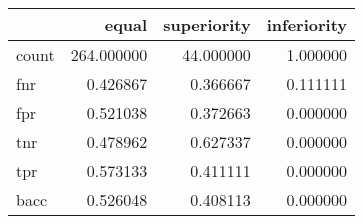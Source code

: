 \begin{tabular}{lrrr}
\toprule
{} &       equal &  superiority &  inferiority \\
\midrule
count &  264.000000 &    44.000000 &     1.000000 \\
fnr   &    0.426867 &     0.366667 &     0.111111 \\
fpr   &    0.521038 &     0.372663 &     0.000000 \\
tnr   &    0.478962 &     0.627337 &     0.000000 \\
tpr   &    0.573133 &     0.411111 &     0.000000 \\
bacc  &    0.526048 &     0.408113 &     0.000000 \\
\bottomrule
\end{tabular}
